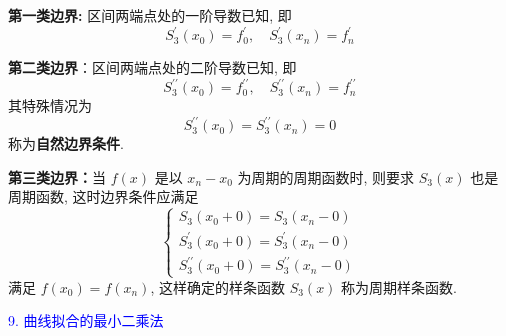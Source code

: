 \textbf{第一类边界:} 区间两端点处的一阶导数已知, 即
$$
S_{3}^{\prime}\left(x_{0}\right)=f_{0}^{\prime}, \quad S_{3}^{\prime}\left(x_{n}\right)=f_{n}^{\prime}
$$

\textbf{第二类边界}：区间两端点处的二阶导数已知, 即
$$
S_{3}^{\prime \prime}\left(x_{0}\right)=f_{0}^{\prime \prime}, \quad S_{3}^{\prime \prime}\left(x_{n}\right)=f_{n}^{\prime \prime}
$$
其特殊情况为
$$
S_{3}^{\prime \prime}\left(x_{0}\right)=S_{3}^{\prime \prime}\left(x_{n}\right)=0
$$
称为\textbf{自然边界条件}.

\textbf{第三类边界：}当 $ f(x) $ 是以 $ x_{n}-x_{0} $ 为周期的周期函数时, 则要求 $ S_{3}(x) $ 也是周期函数, 这时边界条件应满足
$$
\left\{\begin{array}{l}
S_{3}\left(x_{0}+0\right)=S_{3}\left(x_{n}-0\right) \\
S_{3}^{\prime}\left(x_{0}+0\right)=S_{3}^{\prime}\left(x_{n}-0\right) \\
S_{3}^{\prime \prime}\left(x_{0}+0\right)=S_{3}^{\prime \prime}\left(x_{n}-0\right)
\end{array}\right.
$$
满足 $ f\left(x_{0}\right)=f\left(x_{n}\right) $, 这样确定的样条函数 $ S_{3}(x) $ 称为周期样条函数.

\textcolor{blue}{9. 曲线拟合的最小二乘法}

